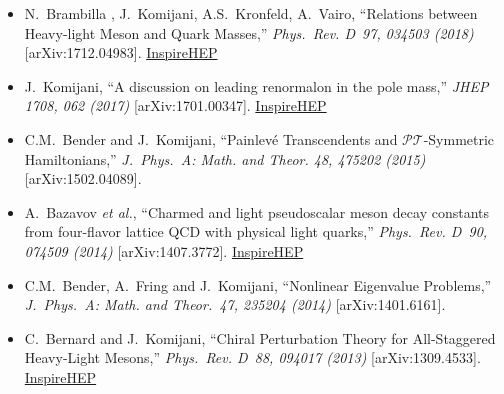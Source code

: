\documentclass[a4paper,10pt]{article}
\begin{document}
\begin{itemize}
\item N.~Brambilla , J.~Komijani, A.S.~Kronfeld, A.~Vairo, ``Relations between Heavy-light Meson and Quark Masses,'' \textit{Phys.~Rev. D~97, 034503 (2018)} [arXiv:1712.04983]. \href{http://inspirehep.net/record/1643281}{InspireHEP}

\item J.~Komijani, ``A discussion on leading renormalon in the pole mass,'' \textit{JHEP 1708, 062 (2017)} [arXiv:1701.00347]. \href{http://inspirehep.net/record/1507484}{InspireHEP}

\item C.M.~Bender and J.~Komijani, ``Painlev\'e Transcendents and ${\mathcal{P}}{\mathcal{T}}$-Symmetric Hamiltonians,'' \textit{J.~Phys.~A: Math. and Theor. 48, 475202 (2015)} [arXiv:1502.04089].

\item A.~Bazavov \textit{et al.}, ``Charmed and light pseudoscalar meson decay constants from four-flavor lattice QCD with physical light quarks,'' \textit{Phys.~Rev. D~90, 074509 (2014)} [arXiv:1407.3772]. \href{http://inspirehep.net/record/1306303}{InspireHEP}

\item C.M.~Bender, A.~Fring and J.~Komijani, ``Nonlinear Eigenvalue Problems,'' \textit{J.~Phys.~A: Math. and Theor.~47, 235204 (2014)} [arXiv:1401.6161].

\item C.~Bernard and J.~Komijani, ``Chiral Perturbation Theory for All-Staggered Heavy-Light Mesons,'' \textit{Phys.~Rev. D~88, 094017 (2013)} [arXiv:1309.4533]. \href{http://inspirehep.net/record/1254568}{InspireHEP}
\end{itemize}
\end{document}
